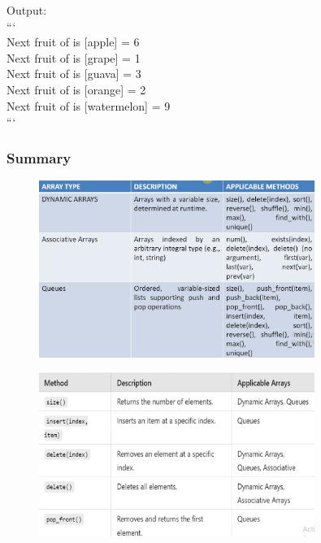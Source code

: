 \documentclass[12pt, a4paper]{article}
\begin{document}
Output:\\
``` \\
  Next fruit of is [apple] = 6 \\
  Next fruit of is [grape] = 1 \\
  Next fruit of is [guava] = 3 \\
  Next fruit of is [orange] = 2 \\
  Next fruit of is [watermelon] = 9 \\
```

\subsubsection{Summary}

\begin{figure}[H]
    \centering
    \includegraphics[width=0.8\textwidth]{DataTypes_sum1.png}
\end{figure}
\vspace{-2em}
\begin{figure}[H]
    \centering
    \includegraphics[width=0.8\textwidth]{DataTypes_sum2.png}
\end{figure}
\end{document}
